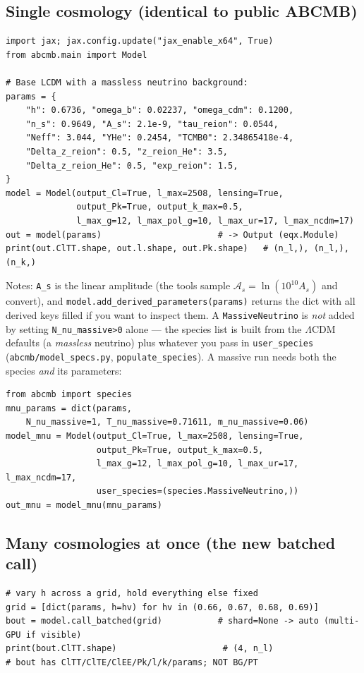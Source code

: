 \documentclass[11pt]{article}
\newcommand{\code}[1]{\texttt{\small #1}}
\newcommand{\file}[1]{\texttt{\small #1}}
\begin{document}
\subsection{Single cosmology (identical to public \textsc{ABCMB})}
\begin{lstlisting}
import jax; jax.config.update("jax_enable_x64", True)
from abcmb.main import Model

# Base LCDM with a massless neutrino background:
params = {
    "h": 0.6736, "omega_b": 0.02237, "omega_cdm": 0.1200,
    "n_s": 0.9649, "A_s": 2.1e-9, "tau_reion": 0.0544,
    "Neff": 3.044, "YHe": 0.2454, "TCMB0": 2.34865418e-4,
    "Delta_z_reion": 0.5, "z_reion_He": 3.5,
    "Delta_z_reion_He": 0.5, "exp_reion": 1.5,
}
model = Model(output_Cl=True, l_max=2508, lensing=True,
              output_Pk=True, output_k_max=0.5,
              l_max_g=12, l_max_pol_g=10, l_max_ur=17, l_max_ncdm=17)
out = model(params)                       # -> Output (eqx.Module)
print(out.ClTT.shape, out.l.shape, out.Pk.shape)   # (n_l,), (n_l,), (n_k,)
\end{lstlisting}
Notes: \code{A\_s} is the linear amplitude (the tools sample
$\mathcal A_s=\ln(10^{10}A_s)$ and convert), and
\code{model.add\_derived\_parameters(params)} returns the dict with all
derived keys filled if you want to inspect them. A \code{MassiveNeutrino} is
\emph{not} added by setting \code{N\_nu\_massive>0} alone --- the species
list is built from the $\Lambda$CDM defaults (a \emph{massless} neutrino)
plus whatever you pass in \code{user\_species}
(\file{abcmb/model\_specs.py}, \code{populate\_species}). A massive run
needs both the species \emph{and} its parameters:
\begin{lstlisting}
from abcmb import species
mnu_params = dict(params,
    N_nu_massive=1, T_nu_massive=0.71611, m_nu_massive=0.06)
model_mnu = Model(output_Cl=True, l_max=2508, lensing=True,
                  output_Pk=True, output_k_max=0.5,
                  l_max_g=12, l_max_pol_g=10, l_max_ur=17, l_max_ncdm=17,
                  user_species=(species.MassiveNeutrino,))
out_mnu = model_mnu(mnu_params)
\end{lstlisting}

\subsection{Many cosmologies at once (the new batched call)}
\begin{lstlisting}
# vary h across a grid, hold everything else fixed
grid = [dict(params, h=hv) for hv in (0.66, 0.67, 0.68, 0.69)]
bout = model.call_batched(grid)           # shard=None -> auto (multi-GPU if visible)
print(bout.ClTT.shape)                     # (4, n_l)
# bout has ClTT/ClTE/ClEE/Pk/l/k/params; NOT BG/PT
\end{lstlisting}
\end{document}
